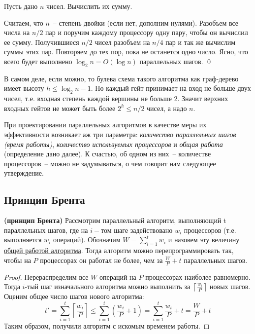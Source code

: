 \begin{problem*}
	Пусть дано $n$ чисел. Вычислить их сумму.
\end{problem*}

 Считаем, что $n$~-- степень двойки (если нет, дополним нулями).  Разобъем все числа на $n/2$ пар и поручим каждому процессору одну пару, чтобы он вычислил ее сумму. Получившиеся $n/2$ чисел разобъем на $n/4$ пар и так же вычислим суммы этих пар. Повторяем до тех пор, пока не останется одно число. Ясно, что всего будет выполнено $\log_2 n = O(\log n)$ параллельных шагов. \qed

 В самом деле, если можно, то булева схема такого алгоритма как граф-дерево имеет высоту $h \leq \log_2 n - 1$. Но каждый гейт принимает на вход не больше двух чисел, т.е. входная степень каждой вершины не больше 2. Значит верхних входных гейтов не может быть более $2^h \leq n/2$  чисел, а надо $n$.

При проектировании параллельных алгоритмов в качестве меры их эффективности возникает аж три параметра: \textit{количество параллельных шагов (время работы)}, \textit{количество используемых процессоров} и \textit{общая работа} (определение дано далее). К счастью, об одном из них~-- количестве процессоров~-- можно не задумываться, о чем говорит нам следующее утверждение.

\subsection{Принцип Брента}
\begin{theorem*}{\bfseries (принцип Брента)}
	Рассмотрим параллельный алгоритм, выполняющий t параллельных шагов, где на $i-$том шаге задействовано $w_i$ процессоров (т.е. выполняется $w_i$ операций). Обозначим $W=\sum\limits_{i=1}^t w_i$ и назовем эту величину \underline{общей работой алгоритма}. Тогда алгоритм можно перепрограммировать так, чтобы на $P$ процессорах он работал не более, чем за $\frac{W}{P} + t$ параллельных шагов.
\end{theorem*}

\begin{proof}
	Перераспределим все $W$ операций на $P$ процессорах наиболее равномерно. Тогда $i$-тый шаг изначального алгоритма можно выполнить за $\left\lceil\frac{w_i}{P}\right\rceil$ новых шагов. Оценим общее число шагов нового алгоритма:
$$t' = \sum_{i=1}^t \left\lceil\frac{w_i}{P}\right\rceil \leq \sum_{i=1}^t \left(\frac{w_i}{P} + 1\right) = \sum_{i=1}^t \frac{w_i}{P} + t = \frac{W}{P} + t$$Таким образом, получили алгоритм с искомым временем работы.
\end{proof}

